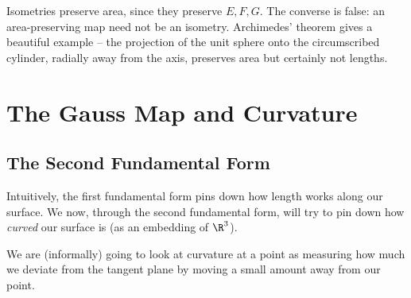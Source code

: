 \begin{remark}
    Isometries preserve area, since they preserve $E, F, G$. The converse is false: an area-preserving map need not be an isometry. Archimedes' theorem gives a beautiful example -- the projection of the unit sphere onto the circumscribed cylinder, radially away from the axis, preserves area but certainly not lengths.
\end{remark}

\section{The Gauss Map and Curvature}

\subsection{The Second Fundamental Form}


Intuitively, the first fundamental form pins down how length works along our surface. We now, through the second fundamental form, will try to pin down how \emph{curved} our surface is (as an embedding of $\R^3$).

We are (informally) going to look at curvature at a point as measuring how much we deviate from the tangent plane by moving a small amount away from our point.

